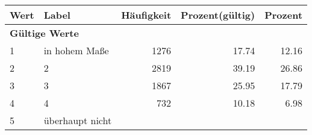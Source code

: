      \begin{longtable}{lXrrr}
     \toprule
     \textbf{Wert} & \textbf{Label} & \textbf{Häufigkeit} & \textbf{Prozent(gültig)} & \textbf{Prozent} \\
     \endhead
     \midrule
     \multicolumn{5}{l}{\textbf{Gültige Werte}}\\

     1 &
     \multicolumn{1}{X}{ in hohem Maße   } &


       \num{1276} &
       \num[round-mode=places,round-precision=2]{17,74} &
         \num[round-mode=places,round-precision=2]{12,16} \\

     2 &
     \multicolumn{1}{X}{ 2   } &


       \num{2819} &
       \num[round-mode=places,round-precision=2]{39,19} &
         \num[round-mode=places,round-precision=2]{26,86} \\

     3 &
     \multicolumn{1}{X}{ 3   } &


       \num{1867} &
       \num[round-mode=places,round-precision=2]{25,95} &
         \num[round-mode=places,round-precision=2]{17,79} \\

     4 &
     \multicolumn{1}{X}{ 4   } &


       \num{732} &
       \num[round-mode=places,round-precision=2]{10,18} &
         \num[round-mode=places,round-precision=2]{6,98} \\

     5 &
     \multicolumn{1}{X}{ überhaupt nicht   } &



\end{longtable}
